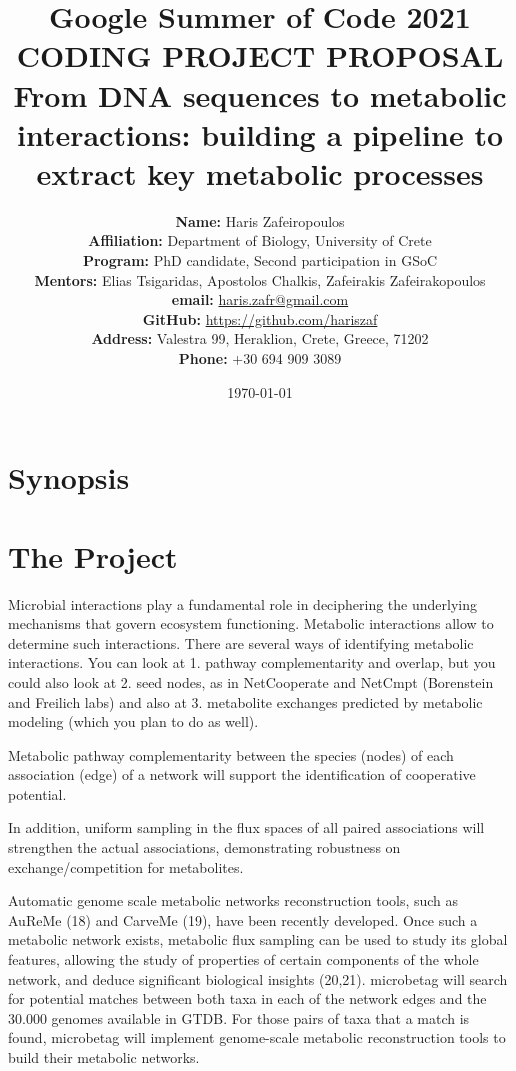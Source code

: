 \documentclass{article}
\title{Google Summer of Code 2021 \\ CODING PROJECT PROPOSAL \\ From DNA sequences to metabolic interactions: building a pipeline to extract key metabolic processes}
\author{
   \textbf{Name:} {Haris Zafeiropoulos} \\
   \textbf{Affiliation:} Department of Biology, University of Crete \\
   \textbf{Program:} PhD candidate, Second participation in GSoC \\
   \textbf{Mentors:} Elias Tsigaridas, Apostolos Chalkis, Zafeirakis Zafeirakopoulos \\
   \textbf{email:} \href{mailto:haris.zafr@gmail.com}{haris.zafr@gmail.com}\\
   \textbf{GitHub:} \href{https://github.com/hariszaf}{https://github.com/hariszaf}\\
   \textbf{Address:} Valestra 99, Heraklion, Crete, Greece, 71202\\
   \textbf{Phone:} +30 694 909 3089
}
\date{\today}
\begin{document}
\maketitle
\tableofcontents



\section{Synopsis}




\section{The Project}


Microbial interactions play a fundamental role in deciphering the underlying mechanisms that govern ecosystem functioning.
Metabolic interactions allow to determine such interactions. 
There are several ways of identifying metabolic interactions. 
You can look at 
1. pathway complementarity and overlap, 
but you could also look at 
2. seed nodes, 
as in NetCooperate and NetCmpt (Borenstein and Freilich labs) 
and also at 
3. metabolite exchanges predicted by metabolic modeling 
(which you plan to do as well). 

Metabolic pathway complementarity between the species (nodes) of each association (edge) of a network will support the identification of cooperative potential.



In addition, uniform sampling in the flux spaces of all paired associations will strengthen the actual associations, demonstrating robustness on exchange/competition for metabolites. 


Automatic genome scale metabolic networks reconstruction tools, such as AuReMe (18) and CarveMe (19), have been recently developed. Once such a metabolic network exists, metabolic flux sampling can be used to study its global features, allowing the study of properties of certain components of the whole network, and deduce significant biological insights (20,21).
microbetag will search for potential matches between both taxa in each of the network edges and the 30.000 genomes available in GTDB. For those pairs of taxa that a match is found, microbetag will implement genome-scale metabolic reconstruction tools to build their metabolic networks. 
\end{document}
